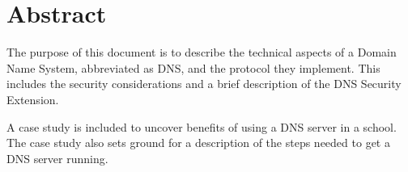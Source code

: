 \chapter*{Abstract}

The purpose of this document is to describe the technical aspects of a Domain Name System, abbreviated as DNS, and the protocol they implement. This includes the security considerations and a brief description of the DNS Security Extension.

A case study is included to uncover benefits of using a DNS server in a school. The case study also sets ground for a description of the steps needed to get a DNS server running. 